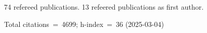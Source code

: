 74 refereed publications. 13 refeered publications as first author.

Total citations~=~4699; h-index~=~36 (2025-03-04)